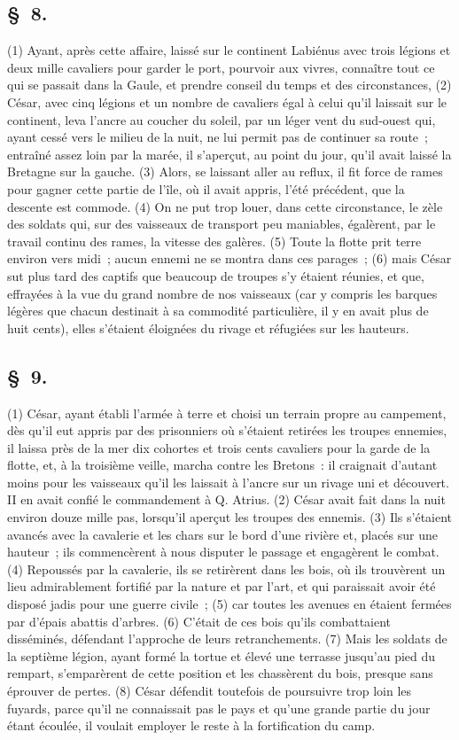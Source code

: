 \documentclass[french,twoside]{book} %
\begin{document}
\subsection[{§ 8.}]{ \textsc{§ 8.} }
\noindent (1) Ayant, après cette affaire, laissé sur le continent Labiénus avec trois légions et deux mille cavaliers pour garder le port, pourvoir aux vivres, connaître tout ce qui se passait dans la Gaule, et prendre conseil du temps et des circonstances, (2) César, avec cinq légions et un nombre de cavaliers égal à celui qu’il laissait sur le continent, leva l’ancre au coucher du soleil, par un léger vent du sud-ouest qui, ayant cessé vers le milieu de la nuit, ne lui permit pas de continuer sa route ; entraîné assez loin par la marée, il s’aperçut, au point du jour, qu’il avait laissé la Bretagne sur la gauche. (3) Alors, se laissant aller au reflux, il fit force de rames pour gagner cette partie de l’île, où il avait appris, l’été précédent, que la descente est commode. (4) On ne put trop louer, dans cette circonstance, le zèle des soldats qui, sur des vaisseaux de transport peu maniables, égalèrent, par le travail continu des rames, la vitesse des galères. (5) Toute la flotte prit terre environ vers midi ; aucun ennemi ne se montra dans ces parages ; (6) mais César sut plus tard des captifs que beaucoup de troupes s’y étaient réunies, et que, effrayées à la vue du grand nombre de nos vaisseaux (car y compris les barques légères que chacun destinait à sa commodité particulière, il y en avait plus de huit cents), elles s’étaient éloignées du rivage et réfugiées sur les hauteurs.
\subsection[{§ 9.}]{ \textsc{§ 9.} }
\noindent (1) César, ayant établi l’armée à terre et choisi un terrain propre au campement, dès qu’il eut appris par des prisonniers où s’étaient retirées les troupes ennemies, il laissa près de la mer dix cohortes et trois cents cavaliers pour la garde de la flotte, et, à la troisième veille, marcha contre les Bretons : il craignait d’autant moins pour les vaisseaux qu’il les laissait à l’ancre sur un rivage uni et découvert. II en avait confié le commandement à Q. Atrius. (2) César avait fait dans la nuit environ douze mille pas, lorsqu’il aperçut les troupes des ennemis. (3) Ils s’étaient avancés avec la cavalerie et les chars sur le bord d’une rivière et, placés sur une hauteur ; ils commencèrent à nous disputer le passage et engagèrent le combat. (4) Repoussés par la cavalerie, ils se retirèrent dans les bois, où ils trouvèrent un lieu admirablement fortifié par la nature et par l’art, et qui paraissait avoir été disposé jadis pour une guerre civile ; (5) car toutes les avenues en étaient fermées par d’épais abattis d’arbres. (6) C'était de ces bois qu’ils combattaient disséminés, défendant l’approche de leurs retranchements. (7) Mais les soldats de la septième légion, ayant formé la tortue et élevé une terrasse jusqu’au pied du rempart, s’emparèrent de cette position et les chassèrent du bois, presque sans éprouver de pertes. (8) César défendit toutefois de poursuivre trop loin les fuyards, parce qu’il ne connaissait pas le pays et qu’une grande partie du jour étant écoulée, il voulait employer le reste à la fortification du camp.
\end{document}

